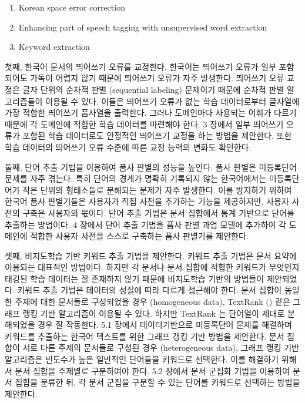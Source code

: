 \documentclass[11pt]{article}
\begin{document}
\begin{enumerate}
    \item Korean space error correction
    \item Enhancing part of speech tagging with unsupervised word extraction
    \item Keyword extraction
\end{enumerate}

첫째, 한국어 문서의 띄어쓰기 오류를 교정한다.
한국어는 띄어쓰기 오류가 일부 포함되어도 가독이 어렵지 않기 때문에 띄어쓰기 오류가 자주 발생한다.
띄어쓰기 오류 교정은 글자 단위의 순차적 판별 (sequential labeling) 문제이기 때문에 순차적 판별 알고리즘들이 이용될 수 있다.
이들은 띄어쓰기 오류가 없는 학습 데이터로부터 글자열에 가장 적합한 띄어쓰기 품사열을 출력한다.
그러나 도메인마다 사용되는 어휘가 다르기 때문에 각 도메인에 적합한 학습 데이터를 마련해야 한다.
3 장에서 일부 띄어쓰기 오류가 포함된 학습 데이터로도 안정적인 띄어쓰기 교정을 하는 방법을 제안한다.
또한 학습 데이터의 띄어쓰기 오류 수준에 따른 교정 능력의 변화도 확인한다.

둘째, 단어 추출 기법을 이용하여 품사 판별의 성능을 높인다.
품사 판별은 미등록단어 문제를 자주 겪는다.
특히 단어의 경계가 명확히 기록되지 않는 한국어에서는 미등록단어가 작은 단위의 형태소들로 분해되는 문제가 자주 발생한다.
이를 방지하기 위하여 한국어 품사 판별기들은 사용자가 직접 사전을 추가하는 기능을 제공하지만, 사용자 사전의 구축은 사용자의 몫이다.
단어 추출 기법은 문서 집합에서 통계 기반으로 단어를 추출하는 방법이다.
4 장에서 단어 추출 기법을 품사 판별 과업 모델에 추가하여 각 도메인에 적합한 사용자 사전을 스스로 구축하는 품사 판별기를 제안한다.

셋째, 비지도학습 기반 키워드 추출 기법을 제안한다.
키워드 추출 기법은 문서 요약에 이용되는 대표적인 방법이다.
하지만 각 문서나 문서 집합에 적합한 키워드가 무엇인지 태깅된 학습 데이터는 잘 존재하지 않기 때문에 비지도학습 기반의 방법들이 제안되었다.
키워드 추출 기법은 데이터의 성질에 따라 다르게 접근해야 한다.
문서 집합이 동일한 주제에 대한 문서들로 구성되었을 경우 (homogeneous data), TextRank (\citep{mihalcea2004textrank}) 같은 그래프 랭킹 기반 알고리즘이 이용될 수 있다.
하지만 TextRank 는 단어열이 제대로 분해되었을 경우 잘 작동한다.
5.1 장에서 데이터기반으로 미등록단어 문제를 해결하며 키워드를 추출하는 한국어 텍스트를 위한 그래프 갱킹 기반 방법을 제안한다.
문서 집합이 서로 다른 주제의 문서들로 구성된 경우 (heterogeneous data), 그래프 랭킹 기반 알고리즘은 빈도수가 높은 일반적인 단어들을 키워드로 선택한다.
이를 해결하기 위해서 문서 집합을 주제별로 구분하여야 한다.
5.2 장에서 문서 군집화 기법을 이용하여 문서 집합을 분류한 뒤, 각 문서 군집을 구분할 수 있는 단어를 키워드로 선택하는 방법을 제안한다.
\end{document}
